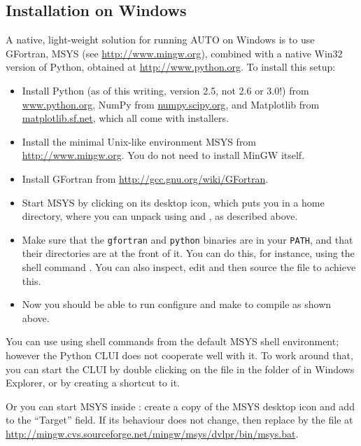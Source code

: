 \documentclass[12pt]{report}
\begin{document}
\subsection{Installation on Windows}
A native, light-weight solution for running AUTO on Windows is
to use GFortran, MSYS (see \url{http://www.mingw.org}),
combined with a native Win32 version of Python,
obtained at \url{http://www.python.org}. To install this setup:
\begin{itemize}
\item
Install Python (as of this writing, version 2.5, not 2.6 or 3.0!)
from \url{www.python.org}, NumPy from \url{numpy.scipy.org},
and Matplotlib from \url{matplotlib.sf.net}, which all come
with installers.
\item
Install the minimal Unix-like environment MSYS from
\url{http://www.mingw.org}. You do not need to install MinGW
itself.
\item
Install GFortran from \url{http://gcc.gnu.org/wiki/GFortran}.
\item
Start MSYS by clicking on its desktop icon, which
puts you in a home directory, where you can unpack
\AUTO using  and , as described above.
\item
Make sure that the {\tt gfortran} and {\tt python} binaries
are in your {\tt PATH}, and that their directories are at the front of it.
You can do this, for instance, using the shell command
.
You can also inspect, edit and then source the file
 to achieve this.
\item
Now you should be able to run configure and make to compile \AUTO
as shown above.
\end{itemize}

You can use \AUTO using shell commands from the default MSYS shell
environment; however the Python CLUI does not cooperate well with it.
To work around that, you can start the CLUI by double clicking on the file
 in the  folder of \AUTO in Windows Explorer,
or by creating a shortcut to it.

Or you can start MSYS inside : create a copy of the MSYS
desktop icon and add  to the ``Target'' field.
If its behaviour does not change, then replace
by the file at
\url{http://mingw.cvs.sourceforge.net/mingw/msys/dvlpr/bin/msys.bat}.
\end{document}
